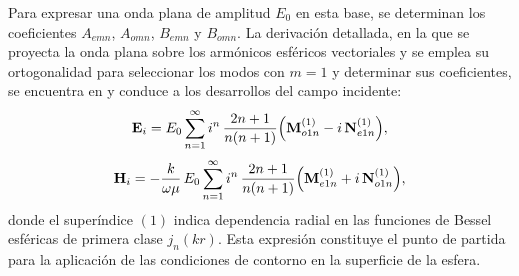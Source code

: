 


\label{subsec:expansion_vectorial}
Para expresar una onda plana de amplitud $E_0$ en esta base, se determinan los 
coeficientes $A_{emn}$, $A_{omn}$, $B_{emn}$ y $B_{omn}$. 
La derivación detallada, en la que se proyecta la onda plana sobre los armónicos
esféricos vectoriales y se emplea su ortogonalidad para seleccionar los modos con
$m=1$ y determinar sus coeficientes, se encuentra en \cite[pp.~91--92]{Bohren1983}
y conduce a los desarrollos del campo incidente:
\begin{equation}
  \mathbf{E}_{i} =
  E_0 \sum_{n=1}^{\infty}
  i^n\,\frac{2n+1}{n(n+1)}
  \Bigl(
    \mathbf{M}_{o1n}^{(1)}
    - i\,\mathbf{N}_{e1n}^{(1)}
  \Bigr),
\end{equation}
\begin{equation}
  \mathbf{H}_{i} =
  -\frac{k}{\omega\mu}\,
  E_0 \sum_{n=1}^{\infty}
  i^n\,\frac{2n+1}{n(n+1)}
  \Bigl(
    \mathbf{M}_{e1n}^{(1)}
    + i\,\mathbf{N}_{o1n}^{(1)}
  \Bigr),
\end{equation}
donde el superíndice $(1)$ indica dependencia radial en las funciones de Bessel
esféricas de primera clase $j_n(kr)$. Esta expresión constituye el punto de
partida para la aplicación de las condiciones de contorno en la superficie de
la esfera.

